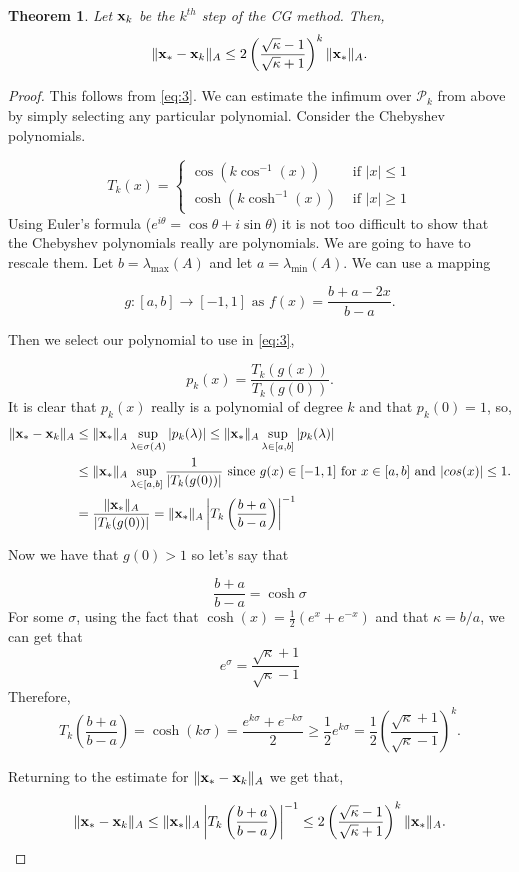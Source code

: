 \documentclass{article}
\newcommand{\bx}{{\bf x}}
\newcommand{\beq}{\begin{equation}}
\newcommand{\eeq}{\end{equation}}
\newtheorem{thm}{Theorem}[section]
\theoremstyle{remark}
\begin{document}
\begin{thm} Let $\bx_k$ be the $k^{th}$ step of the CG method. Then,
\label{thm:conv}
\beq
\|\bx_* - \bx_k \|_A \leq 2 \left(\frac{\sqrt{\kappa}-1}{\sqrt{\kappa}+1} \right)^k \|\bx_*\|_A.
\eeq
\end{thm}
\begin{proof}
This follows from \eqref{eq:3}. We can estimate the infimum over $\mathcal{P}_k$ from above by simply selecting any particular polynomial. Consider the Chebyshev polynomials. 

\beq
T_k(x) = \begin{cases} \cos(k \cos^{-1}(x)) &\text{ if } |x| \leq 1\\
\cosh(k \cosh^{-1}(x)) &\text{ if } |x| \geq 1
\end{cases}
\eeq
Using Euler's formula ($e^{i\theta} = \cos\theta + i\sin\theta$) it is not too difficult to show that the Chebyshev polynomials really are polynomials. We are going to have to rescale them. Let $b = \lambda_{\max}(A)$ and let $a = \lambda_{\min}(A)$. We can use a mapping

\beq
g: [a,b] \to [-1,1] \text{ as } f(x) = \frac{b+a - 2x}{b-a}.
\eeq

Then we select our polynomial to use in \eqref{eq:3}, 

\beq
p_k(x) = \frac{T_k(g(x))}{T_k(g(0))}.
\eeq
It is clear that $p_k(x)$ really is a polynomial of degree $k$ and that $p_k(0) = 1$, so, 
\begin{align}
\|\bx_* - \bx_k \|_A &\leq \|\bx_* \|_A \sup_{\lambda \in \sigma(A)} |p_k(\lambda) | \leq  \|\bx_* \|_A \sup_{\lambda \in [a,b]} |p_k(\lambda) |\\
&\leq  \|\bx_* \|_A \sup_{\lambda \in [a,b]} \frac{1}{|T_k(g(0))|} \text{ since } g(x) \in[-1,1] \text{ for } x\in[a,b] \text{ and } |cos(x)| \leq 1.\\
&= \frac{ \|\bx_* \|_A}{|T_k(g(0))|} =  \|\bx_* \|_A \left|T_k\left(\frac{b+a}{b-a}\right) \right|^{-1}
\end{align}

Now we have that $g(0) > 1$ so let's say that 

\beq
\frac{b+a}{b-a} = \cosh \sigma 
\eeq
For some $\sigma$, using the fact that $\cosh(x) = \tfrac{1}{2}(e^x + e^{-x})$ and that $\kappa = b/a$, we can get that 
\beq
e^{\sigma} = \frac{\sqrt{\kappa}+1}{\sqrt{\kappa}-1}
\eeq
Therefore, 
\beq 
T_k\left(\frac{b+a}{b-a}\right) = \cosh(k\sigma) = \frac{e^{k\sigma}+ e^{-k\sigma}}{2} \geq \frac{1}{2}e^{k\sigma} = \frac{1}{2}\left(  \frac{\sqrt{\kappa}+1}{\sqrt{\kappa}-1}\right)^k.
\eeq

Returning to the estimate for $\|\bx_* - \bx_k\|_A$ we get that, 

\beq
\|\bx_* - \bx_k \|_A \leq  \|\bx_* \|_A \left|T_k\left(\frac{b+a}{b-a}\right) \right|^{-1} \leq 2\left(\frac{\sqrt{\kappa}-1}{\sqrt{\kappa}+1}\right)^k  \|\bx_* \|_A.
\eeq


\end{proof}
\end{document}
